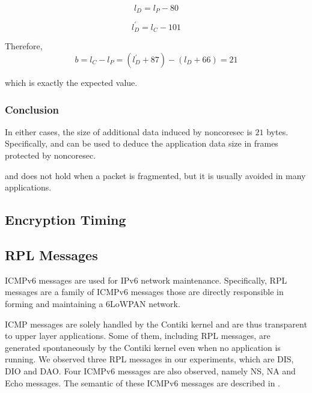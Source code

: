 \begin{equation}
	l_D= l_P - 80
\end{equation}

\begin{equation} \label{Eq: unicast llsec data size}
	l^{\prime}_D = l_{C} - 101 
\end{equation}

Therefore, 
\begin{equation}
	b = l_C - l_P = (l^{\prime}_D + 87) - (l_D + 66) = 21
\end{equation}

which is exactly the expected value.

\subsubsection{Conclusion}

In either cases, the size of additional data induced by noncoresec is $21$ bytes. Specifically,  and  can be used to deduce the application data size in frames protected by noncoresec.

 and  does not hold when a packet is fragmented, but it is usually avoided in many applications.

\subsection{Encryption Timing}

\subsection{RPL Messages}

ICMPv6 messages are used for IPv6 network maintenance. Specifically, RPL messages are a family of ICMPv6 messages those are directly responsible in forming and maintaining a 6LoWPAN network. 

ICMP messages are solely handled by the Contiki kernel and are thus transparent to  upper layer applications. Some of them, including RPL messages, are generated spontaneously by the Contiki kernel even when no application is running. We observed three RPL messages in our experiments, which are DIS, DIO and DAO. Four ICMPv6 messages are also observed, namely NS, NA and Echo messages. The semantic of these ICMPv6 messages are described in .

